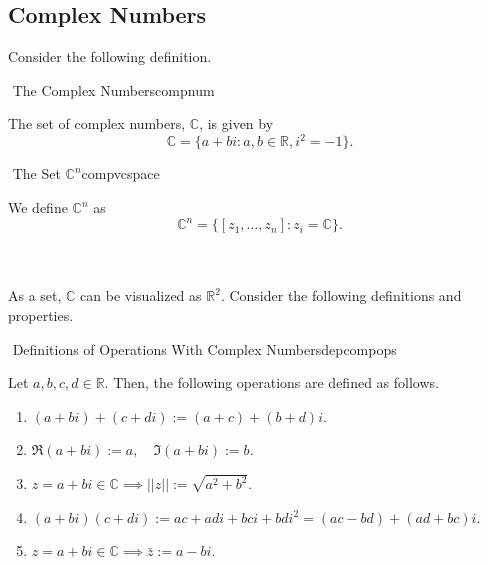     \subsection{Complex Numbers}

        Consider the following definition.
        \begin{definition}{\Stop\,\,The Complex Numbers}{compnum}

            The set of complex numbers, \(\mathbb{C}\), is given by
            \begin{equation*}
                \mathbb{C}=\{a+bi:a,b\in\mathbb{R},i^2=-1\}.
            \end{equation*}
            
        \end{definition}
        \begin{definition}{\Stop\,\,The Set \(\mathbb{C}^n\)}{compvcspace}

            We define \(\mathbb{C}^n\) as
            \begin{equation*}
                \mathbb{C}^n=\{[z_1,\ldots,z_n]:z_i=\mathbb{C}\}.
            \end{equation*}
            
        \end{definition}
        \vphantom
        \\
        \\
        As a set, \(\mathbb{C}\) can be visualized as \(\mathbb{R}^2\). Consider the following definitions and properties.
        \begin{definition}{\Stop\,\,Definitions of Operations With Complex Numbers}{depcompops}
            
            Let \(a,b,c,d\in\mathbb{R}\). Then, the following operations are defined as follows.
            \begin{enumerate}
                \item \((a+bi)+(c+di):=(a+c)+(b+d)i\).
                \item \(\Re (a+bi):=a,\quad \Im (a+bi):=b\).
                \item \(z=a+bi\in\mathbb{C}\implies||z||:=\sqrt{a^2+b^2}\).
                \item \((a+bi)(c+di):=ac+adi+bci+bdi^2=(ac-bd)+(ad+bc)i\).
                \item \(z=a+bi\in\mathbb{C}\implies\bar{z}:=a-bi\).
            \end{enumerate}

        \end{definition}
